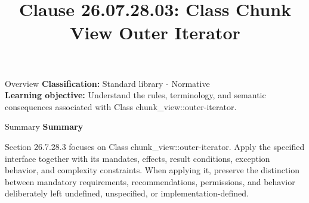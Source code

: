 \documentclass[10pt,letterpaper]{article}
\title{Clause 26.07.28.03: Class Chunk View Outer Iterator}
\author{}
\date{}
\begin{document}
\maketitle
\begin{CornellOverviewBox}{Overview}
\textbf{Classification:} Standard library - Normative\\[2pt]
\textbf{Learning objective:} Understand the rules, terminology, and semantic consequences associated with Class chunk\_view::outer-iterator.
\end{CornellOverviewBox}\begin{CornellSummaryBox}{Summary}
{\sffamily\bfseries\color{Accent} Summary}\par\vspace{3pt}Section 26.7.28.3 focuses on Class chunk\_view::outer-iterator. Apply the specified interface together with its mandates, effects, result conditions, exception behavior, and complexity constraints. When applying it, preserve the distinction between mandatory requirements, recommendations, permissions, and behavior deliberately left undefined, unspecified, or implementation-defined.
\end{CornellSummaryBox}
\end{document}
